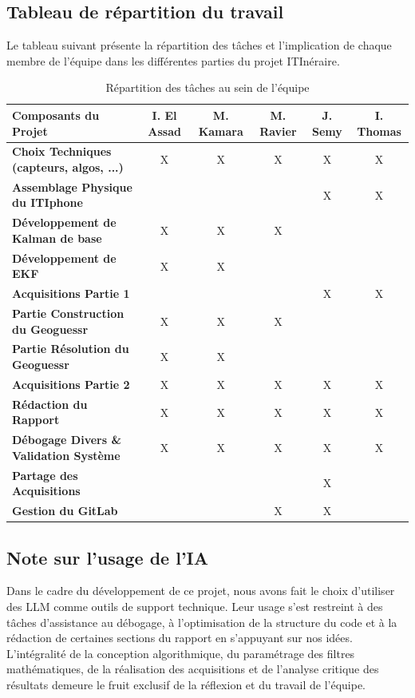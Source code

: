 \subsection{Tableau de répartition du travail}

Le tableau suivant présente la répartition des tâches et l'implication de chaque membre de l'équipe dans les différentes parties du projet ITInéraire.

\begin{table}[H]
    \centering
    \renewcommand{\arraystretch}{1.3}
    \footnotesize %
    \begin{tabular}{|l|c|c|c|c|c|}
        \hline
        \textbf{Composants du Projet} & \textbf{I. El Assad} & \textbf{M. Kamara} & \textbf{M. Ravier} & \textbf{J. Semy} & \textbf{I. Thomas} \\ \hline
        \textbf{Choix Techniques (capteurs, algos, ...)} & X & X & X & X & X \\ \hline
        \textbf{Assemblage Physique du ITIphone} &  &  &  & X & X \\ \hline
        \textbf{Développement de Kalman de base} & X & X & X &  &  \\ \hline
        \textbf{Développement de EKF} & X & X &  &  &  \\ \hline
        \textbf{Acquisitions Partie 1} &  & &  & X & X \\ \hline
        \textbf{Partie Construction du Geoguessr} & X & X & X &  &  \\ \hline
        \textbf{Partie Résolution du Geoguessr} & X & X &  &  &  \\ \hline
        \textbf{Acquisitions Partie 2} & X & X & X & X & X \\ \hline
        \textbf{Rédaction du Rapport} & X & X & X & X & X \\ \hline
        \textbf{Débogage Divers \& Validation Système} & X & X & X & X & X \\ \hline
        \textbf{Partage des Acquisitions}  &  &  &  & X &   \\ \hline
        \textbf{Gestion du GitLab} &  &  & X & X &  \\ \hline
    \end{tabular}
    \caption{Répartition des tâches au sein de l'équipe}
    \label{tab:repartition}
\end{table}

\subsection{Note sur l'usage de l'IA}

Dans le cadre du développement de ce projet, nous avons fait le choix d'utiliser des LLM comme outils de support technique. Leur usage s'est restreint à des tâches d'assistance au débogage, à l'optimisation de la structure du code et à la rédaction de certaines sections du rapport en s'appuyant sur nos idées. L'intégralité de la conception algorithmique, du paramétrage des filtres mathématiques, de la réalisation des acquisitions et de l'analyse critique des résultats demeure le fruit exclusif de la réflexion et du travail de l'équipe.
